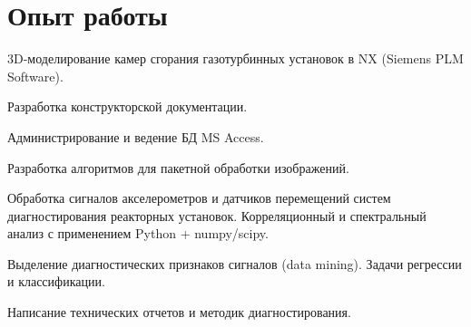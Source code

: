 \documentclass[a4paper]{resume}
\begin{document}
\begin{minipage}[t]{0.63\textwidth} %

\section{Опыт работы}


\vspace{\topsep} %
\begin{tightitemize}
\item 3D-моделирование камер сгорания газотурбинных установок в NX (Siemens PLM Software).
\item Разработка конструкторской документации.
\end{tightitemize}

\sectionspace 


\begin{tightitemize}
\item Администрирование и ведение БД MS Access.
\item Разработка алгоритмов для пакетной обработки изображений. 
\end{tightitemize}

\sectionspace 


\begin{tightitemize}
\item Обработка сигналов акселерометров и датчиков перемещений систем диагностирования реакторных установок. Корреляционный и спектральный анализ с применением Python + numpy/scipy.
\item Выделение диагностических признаков сигналов (data mining). Задачи регрессии и классификации.
\item Написание технических отчетов и методик диагностирования.
\end{tightitemize}


\end{minipage}
\end{document}
